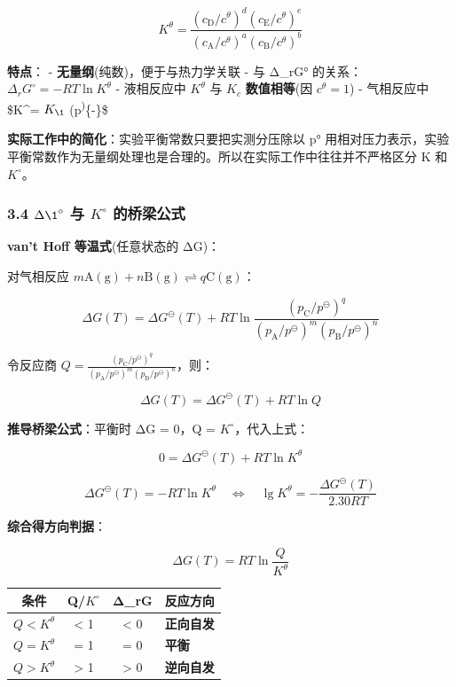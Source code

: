 \[
K^\theta = \frac{(c_\mathrm{D}/c^\theta)^d(c_\mathrm{E}/c^\theta)^e}{(c_\mathrm{A}/c^\theta)^a(c_\mathrm{B}/c^\theta)^b}
\]

\textbf{特点}：
- \textbf{无量纲}(纯数)，便于与热力学关联
- 与 Δ\_rG° 的关系：\(\Delta_rG^\circ = -RT\ln K^\theta\)
- 液相反应中 \(K^\theta\) 与 \(K_c\) \textbf{数值相等}(因 \(c^\theta = 1\))
- 气相反应中 \$K\^{}\theta = \(K_{\1}\) \cdot (p\textsuperscript{\theta)}\{-\Delta\nu\}\$

\textbf{实际工作中的简化}：实验平衡常数只要把实测分压除以 p° 用相对压力表示，实验平衡常数作为无量纲处理也是合理的。所以在实际工作中往往并不严格区分 K 和 \(K^{\circ}\)。

\subsubsection{\texorpdfstring{3.4 \(\Delta \1^{\circ}\) 与 \(K^{\circ}\) 的桥梁公式}{3.4 \textbackslash Delta \textbackslash1\^{}\{\textbackslash circ\} 与 K\^{}\{\textbackslash circ\} 的桥梁公式}}\label{delta-1circ-ux4e0e-kcirc-ux7684ux6865ux6881ux516cux5f0f}

\textbf{van't Hoff 等温式}(任意状态的 ΔG)：

对气相反应 \(m\mathrm{A(g)} + n\mathrm{B(g)} \rightleftharpoons q\mathrm{C(g)}\)：

\[
\Delta G(T) = \Delta G^\ominus(T) + RT\ln\frac{(p_\mathrm{C}/p^\ominus)^q}{(p_\mathrm{A}/p^\ominus)^m(p_\mathrm{B}/p^\ominus)^n}
\]

令反应商 \(Q = \frac{(p_\mathrm{C}/p^\ominus)^q}{(p_\mathrm{A}/p^\ominus)^m(p_\mathrm{B}/p^\ominus)^n}\)，则：

\[
\boxed{\Delta G(T) = \Delta G^\ominus(T) + RT\ln Q}
\]

\textbf{推导桥梁公式}：平衡时 ΔG = 0，Q = \(K^{\circ}\)，代入上式：

\[
0 = \Delta G^\ominus(T) + RT\ln K^\theta
\]

\[
\boxed{\Delta G^\ominus(T) = -RT\ln K^\theta \quad \Longleftrightarrow \quad \lg K^\theta = -\frac{\Delta G^\ominus(T)}{2.30RT}}
\]

\textbf{综合得方向判据}：

\[
\Delta G(T) = RT\ln\frac{Q}{K^\theta}
\]

{\def\LTcaptype{none} %
\begin{longtable}[]{@{}cccl@{}}
\toprule\noalign{}
条件 & Q/\(K^{\circ}\) & Δ\_rG & 反应方向 \\
\midrule\noalign{}
\endhead
\bottomrule\noalign{}
\endlastfoot
\(Q < K^\theta\) & \textless{} 1 & \textless{} 0 & \textbf{正向自发} \\
\(Q = K^\theta\) & = 1 & = 0 & \textbf{平衡} \\
\(Q > K^\theta\) & \textgreater{} 1 & \textgreater{} 0 & \textbf{逆向自发} \\
\end{longtable}
}

